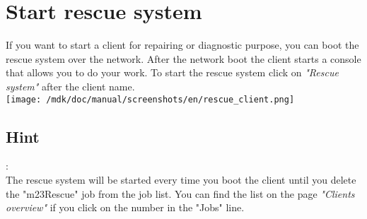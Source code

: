 \section{Start rescue system}If you want to start a client for repairing or diagnostic purpose, you can boot the rescue system over the network. After the network boot the client starts a console that allows you to do your work. To start the rescue system click on \textit{"Rescue system"} after the client name.\\
\texttt{[image: /mdk/doc/manual/screenshots/en/rescue\_client.png]} \\
\subsection{Hint}:\\
The rescue system will be started every time you boot the client until you delete the "m23Rescue" job from the job list. You can find the list  on the page \textit{"Clients overview"} if you click on the number in the "Jobs" line.\\
